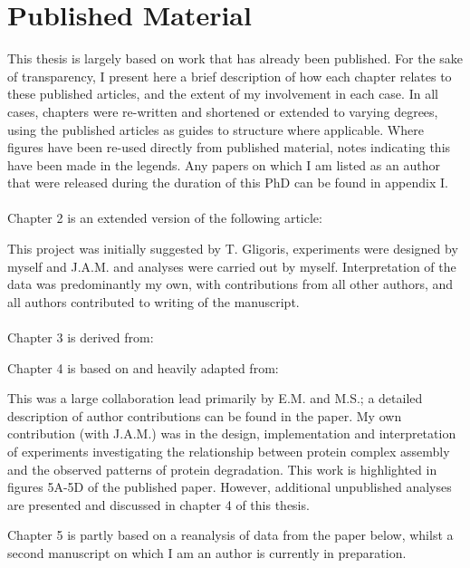 \documentclass[a4paper,11pt,twoside,openright]{scrbook}
\begin{document}
\chapter*{Published Material}
This thesis is largely based on work that has already been published. For the sake of transparency, I present here a brief description of how each chapter relates to these published articles, and the extent of my involvement in each case. In all cases, chapters were re-written and shortened or extended to varying degrees, using the published articles as guides to structure where applicable. Where figures have been re-used directly from published material, notes indicating this have been made in the legends. Any papers on which I am listed as an author that were released during the duration of this PhD can be found in appendix I.
\\~\\
Chapter 2 is an extended version of the following article:
\begin{quote}
\end{quote}
This project was initially suggested by T. Gligoris, experiments were designed by myself and J.A.M. and analyses were carried out by myself. Interpretation of the data was predominantly my own, with contributions from all other authors, and all authors contributed to writing of the manuscript.
\\~\\
Chapter 3 is derived from:
\begin{quote}
\end{quote}


Chapter 4 is based on and heavily adapted from:
\begin{quote}
\end{quote}
This was a large collaboration lead primarily by E.M. and M.S.; a detailed description of author contributions can be found in the paper. My own contribution (with J.A.M.) was in the design, implementation and interpretation of experiments investigating the relationship between protein complex assembly and the observed patterns of protein degradation. This work is highlighted in figures 5A-5D of the published paper. However, additional unpublished analyses are presented and discussed in chapter 4 of this thesis.

Chapter 5 is partly based on a reanalysis of data from the paper below, whilst a second manuscript on which I am an author is currently in preparation.
\end{document}
